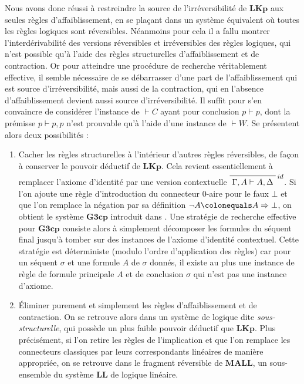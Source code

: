 \documentclass[12pt]{report}
\newcommand{\lto}{\Rightarrow}
\newcommand{\seq}{\vdash}
\newcommand{\irule}[1]{\footnotesize$#1$}
\newcommand{\iruleR}[1]{\irule{\seq{#1}}}
\begin{document}
Nous avons donc réussi à restreindre la source de l'irréversibilité de $\mathbf{LKp}$ aux seules règles d'affaiblissement, en se plaçant dans un système équivalent où toutes les règles logiques sont réversibles. Néanmoins pour cela il a fallu montrer l'interdérivabilité des versions réversibles et irréversibles des règles logiques, qui n'est possible qu'à l'aide des règles structurelles d'affaiblissement et de contraction. Or pour atteindre une procédure de recherche véritablement effective, il semble nécessaire de se débarrasser d'une part de l'affaiblissement qui est source d'irréversibilité, mais aussi de la contraction, qui en l'absence d'affaiblissement devient aussi source d'irréversibilité. Il suffit pour s'en convaincre de considérer l'instance de {\iruleR{C}} ayant pour conclusion $p \seq p$, dont la prémisse $p \seq p,p$ n'est prouvable qu'à l'aide d'une instance de {\iruleR{W}}. Se présentent alors deux possibilités :
\begin{enumerate}
	\item Cacher les règles structurelles à l'intérieur d'autres règles réversibles, de façon à conserver le pouvoir déductif de $\mathbf{LKp}$. Cela revient essentiellement à remplacer l'axiome d'identité par une version contextuelle $\prfbyaxiom{\irule{id}}{\Gamma,A \seq A,\Delta}$. Si l'on ajoute une règle d'introduction du connecteur 0-aire pour le faux $\bot$ et que l'on remplace la négation par sa définition $\neg A \colonequals A \lto \bot$, on obtient le système $\mathbf{G3cp}$ introduit dans \cite{vPN01}. Une stratégie de recherche effective pour $\mathbf{G3cp}$ consiste alors à simplement décomposer les formules du séquent final jusqu'à tomber sur des instances de l'axiome d'identité contextuel. Cette stratégie est déterministe (modulo l'ordre d'application des règles) car pour un séquent $\sigma$ et une formule $A$ de $\sigma$ donnés, il existe au plus une instance de règle de formule principale $A$ et de conclusion $\sigma$ qui n'est pas une instance d'axiome.
    \item Éliminer purement et simplement les règles d'affaiblissement et de contraction. On se retrouve alors dans un système de logique dite \emph{sous-structurelle}, qui possède un plus faible pouvoir déductif que $\mathbf{LKp}$. Plus précisément, si l'on retire les règles de l'implication et que l'on remplace les connecteurs classiques par leurs correspondants linéaires de manière appropriée, on se retrouve dans le fragment réversible de $\mathbf{MALL}$, un sous-ensemble du système $\mathbf{LL}$ de logique linéaire.
\end{enumerate}
\end{document}
